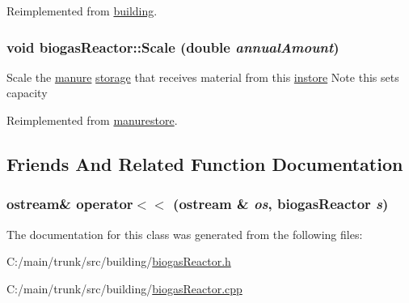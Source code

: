 Reimplemented from \hyperlink{classbuilding_a5649b5598b63c3a4cf7a4e6e7d452d5d}{building}.\hypertarget{classbiogas_reactor_a479439eabed31849643a005f9f6eb66d}{
\subsubsection[{Scale}]{\setlength{\rightskip}{0pt plus 5cm}void biogasReactor::Scale (double {\em annualAmount})}}
\label{classbiogas_reactor_a479439eabed31849643a005f9f6eb66d}
Scale the \hyperlink{classmanure}{manure} \hyperlink{classstorage}{storage} that receives material from this \hyperlink{classinstore}{instore} Note this sets capacity 

Reimplemented from \hyperlink{classmanurestore_a1efaaee1df384e1eb1705c104d8567c7}{manurestore}.

\subsection{Friends And Related Function Documentation}
\hypertarget{classbiogas_reactor_a84f4451be8bd18d8be52ecd0da4337ca}{
\subsubsection[{operator$<$$<$}]{\setlength{\rightskip}{0pt plus 5cm}ostream\& operator$<$$<$ (ostream \& {\em os}, \/  {\bf biogasReactor} {\em s})}}
\label{classbiogas_reactor_a84f4451be8bd18d8be52ecd0da4337ca}


The documentation for this class was generated from the following files:\begin{DoxyCompactItemize}
\item 
C:/main/trunk/src/building/\hyperlink{biogas_reactor_8h}{biogasReactor.h}\item 
C:/main/trunk/src/building/\hyperlink{biogas_reactor_8cpp}{biogasReactor.cpp}\end{DoxyCompactItemize}
